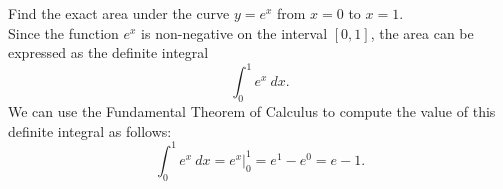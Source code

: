 \documentclass{ximera}
\begin{document}
\begin{example} %
Find the exact area under the curve $y = e^x$ from $x = 0$ to $x = 1$.\\
Since the function $e^x$ is non-negative on the interval $[0, 1]$, the area can be expressed as the definite integral
\[\int_0^1 e^x \ dx.\]
We can use the Fundamental Theorem of Calculus to compute the value of this definite integral as follows:
\[\int_0^{1} e^x \ dx = e^x \Big|_0^{1} = e^{1} - e^0= e- 1.\]


\begin{image}
\end{image}

\end{example}
\end{document}
